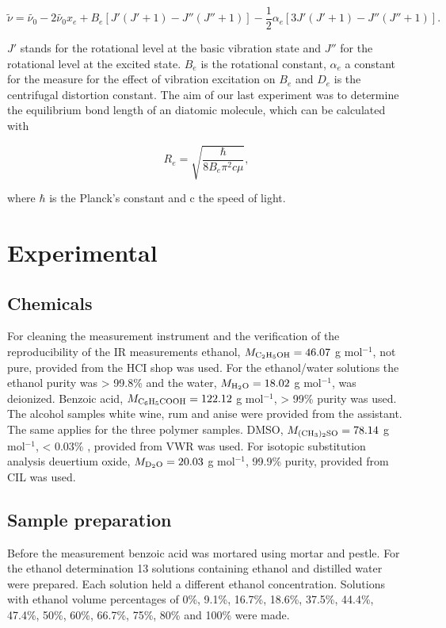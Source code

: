 \documentclass[a4paper,abstracton]{article}	                       %
\renewcommand{\cite}{\supercite}						%
\begin{document}
\begin{equation}\label{eq:TeilG1}
   {\tilde{\nu}} = \tilde{\nu_{0}} - 2\tilde{\nu_{0}}x_{e} + B_{e}[J'(J' + 1) - J''(J'' + 1)] - \frac{1}{2}\alpha_{e}[3J'(J' + 1) - J''(J'' + 1)].
\end{equation}

$J'$ stands for the rotational level at the basic vibration state and $J''$ for the rotational level at the excited state. $B_{e}$ is the rotational constant, $\alpha_{e}$ a constant for the measure for the effect of vibration excitation on $B_{e}$ and $D_{e}$ is the centrifugal distortion constant\cite{meister}. The aim of our last experiment was to determine the equilibrium bond length of an diatomic molecule, which can be calculated with

\begin{equation}\label{eq:TeilG2}
   {R_{e}} = \sqrt{\frac{\hbar}{8B_{e}\pi^2 c \mu}},
\end{equation}

where $\hbar$ is the Planck's constant and c the speed of light.

\section*{Experimental}
\subsection*{Chemicals}
For cleaning the measurement instrument and the verification of the reproducibility of the IR measurements ethanol,
$ M_{\ce{C2H5OH}}= 46.07$ \si{\g} \si{\mol}$^{-1}$\cite{ethanol}, not pure, provided from the HCI shop was used. For the ethanol/water solutions the ethanol purity was > 99.8\% and the water, $ M_{\ce{H2O}}= 18.02$ \si{\g} \si{\mol}$^{-1}$\cite{water}, was deionized. Benzoic acid, $M_{\ce{C6H5COOH}}= 122.12$ \si{\g} \si{\mol}$^{-1}$\cite{Benzoa}, > 99\% purity was used. The alcohol samples white wine, rum and anise were provided from the assistant. The same applies for the three polymer samples. DMSO, $M_{\ce{(CH3)2SO}}= 78.14$ \si{\g} \si{\mol}$^{-1}$\cite{DMSO1}, < 0.03\% , provided from VWR was used. For isotopic substitution analysis deuertium oxide, $M_{\ce{D2O}}= 20.03$ \si{\g} \si{\mol}$^{-1}$\cite{D2O}, 99.9\% purity, provided from CIL was used.

\subsection*{Sample preparation}
Before the measurement benzoic acid was mortared using mortar and pestle. For the ethanol determination 13 solutions containing ethanol and distilled water were prepared. Each solution held a different ethanol concentration. Solutions with ethanol volume percentages of 0\%, 9.1\%, 16.7\%, 18.6\%, 37.5\%, 44.4\%, 47.4\%, 50\%, 60\%, 66.7\%, 75\%, 80\% and 100\% were made. 
\end{document}
